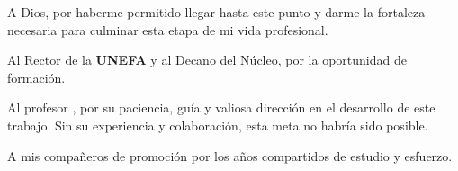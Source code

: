 \vfill 

A Dios, por haberme permitido llegar hasta este punto y darme la fortaleza necesaria para culminar esta etapa de mi vida profesional.

Al Rector de la \textbf{UNEFA} y al Decano del Núcleo, por la oportunidad de formación.

Al profesor \textbf{\datosTutorNombre}, por su paciencia, guía y valiosa dirección en el desarrollo de este trabajo. Sin su experiencia y colaboración, esta meta no habría sido posible.

A mis compañeros de promoción por los años compartidos de estudio y esfuerzo.

\vspace{1cm}
\begin{flushright}
    \textbf{\datosAutorNombre} 
\end{flushright}

\vfill

